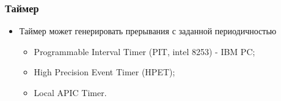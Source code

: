 \begin{frame}
\frametitle{Таймер}
\begin{itemize}
    \item<1->Таймер может генерировать прерывания с заданной периодичностью
    \begin{itemize}
        \item<1->Programmable Interval Timer (PIT, intel 8253) - IBM PC;
        \item<2->High Precision Event Timer (HPET);
        \item<3->Local APIC Timer.
    \end{itemize}
\end{itemize}
\end{frame}
